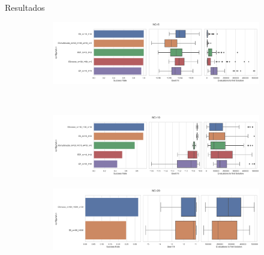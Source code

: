 \documentclass[pdf]{beamer}
\begin{document}
\begin{frame}{Resultados}
		\begin{figure}
		\begin{subfigure}[t]{\textwidth}
			\centering
			\includegraphics[scale=0.23]{img/NC=5.png}
		\end{subfigure}\
		\begin{subfigure}[t]{\textwidth}
			\centering
			\includegraphics[scale=0.23]{img/NC=10.png}
		\end{subfigure}
		\begin{subfigure}[t]{\textwidth}
			\centering
			\includegraphics[scale=0.22]{img/NC=20.png}
		\end{subfigure}
	\end{figure}
\end{frame}
\end{document}

